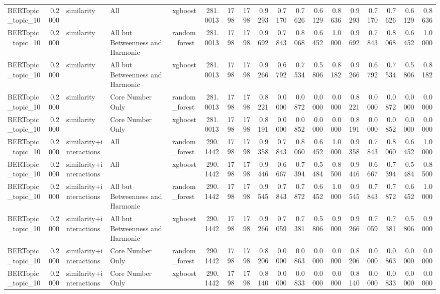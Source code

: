 \begin{tabular}{lrlllrrrrrrrrrrrrr}
BERTopic_topic_10 & 0.2000 & similarity & All & xgboost & 281.0013 & 1798 & 1798 & 0.9293 & 0.7170 & 0.7626 & 0.6129 & 0.8636 & 0.9293 & 0.7170 & 0.7626 & 0.6129 & 0.8636 \\
BERTopic_topic_10 & 0.2000 & similarity & All but Betweenness and Harmonic & random_forest & 281.0013 & 1798 & 1798 & 0.9692 & 0.7843 & 0.8068 & 0.6452 & 1.0000 & 0.9692 & 0.7843 & 0.8068 & 0.6452 & 1.0000 \\
BERTopic_topic_10 & 0.2000 & similarity & All but Betweenness and Harmonic & xgboost & 281.0013 & 1798 & 1798 & 0.9266 & 0.6792 & 0.7534 & 0.5806 & 0.8182 & 0.9266 & 0.6792 & 0.7534 & 0.5806 & 0.8182 \\
BERTopic_topic_10 & 0.2000 & similarity & Core Number Only & random_forest & 281.0013 & 1798 & 1798 & 0.8221 & 0.0000 & 0.0872 & 0.0000 & 0.0000 & 0.8221 & 0.0000 & 0.0872 & 0.0000 & 0.0000 \\
BERTopic_topic_10 & 0.2000 & similarity & Core Number Only & xgboost & 281.0013 & 1798 & 1798 & 0.8191 & 0.0000 & 0.0852 & 0.0000 & 0.0000 & 0.8191 & 0.0000 & 0.0852 & 0.0000 & 0.0000 \\
BERTopic_topic_10 & 0.2000 & similarity+interactions & All & random_forest & 290.1442 & 1798 & 1798 & 0.9358 & 0.7843 & 0.8060 & 0.6452 & 1.0000 & 0.9358 & 0.7843 & 0.8060 & 0.6452 & 1.0000 \\
BERTopic_topic_10 & 0.2000 & similarity+interactions & All & xgboost & 290.1442 & 1798 & 1798 & 0.9446 & 0.6667 & 0.7394 & 0.5484 & 0.8500 & 0.9446 & 0.6667 & 0.7394 & 0.5484 & 0.8500 \\
BERTopic_topic_10 & 0.2000 & similarity+interactions & All but Betweenness and Harmonic & random_forest & 290.1442 & 1798 & 1798 & 0.9545 & 0.7843 & 0.7872 & 0.6452 & 1.0000 & 0.9545 & 0.7843 & 0.7872 & 0.6452 & 1.0000 \\
BERTopic_topic_10 & 0.2000 & similarity+interactions & All but Betweenness and Harmonic & xgboost & 290.1442 & 1798 & 1798 & 0.9266 & 0.7059 & 0.7381 & 0.5806 & 0.9000 & 0.9266 & 0.7059 & 0.7381 & 0.5806 & 0.9000 \\
BERTopic_topic_10 & 0.2000 & similarity+interactions & Core Number Only & random_forest & 290.1442 & 1798 & 1798 & 0.8206 & 0.0000 & 0.0863 & 0.0000 & 0.0000 & 0.8206 & 0.0000 & 0.0863 & 0.0000 & 0.0000 \\
BERTopic_topic_10 & 0.2000 & similarity+interactions & Core Number Only & xgboost & 290.1442 & 1798 & 1798 & 0.8140 & 0.0000 & 0.0833 & 0.0000 & 0.0000 & 0.8140 & 0.0000 & 0.0833 & 0.0000 & 0.0000 \\

\end{tabular}

